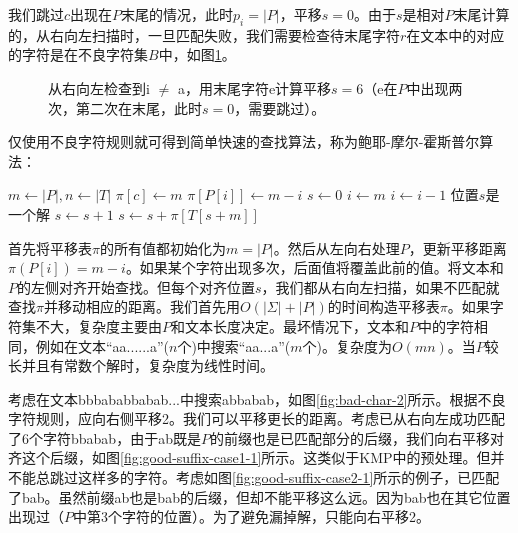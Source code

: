 \documentclass[b5paper]{ctexart}
\begin{document}
我们跳过$c$出现在$P$末尾的情况，此时$p_i = |P|$，平移$s = 0$。由于$s$是相对$P$末尾计算的，从右向左扫描时，一旦匹配失败，我们需要检查待末尾字符$r$在文本中的对应的字符是在不良字符集$B$中，如图\ref{fig:good-char-2}。

\begin{figure}[htbp]
 \centering
 \caption{从右向左检查到i $\neq$ a，用末尾字符e计算平移$s = 6$（e在$P$中出现两次，第二次在末尾，此时$s=0$，需要跳过）。}
 \label{fig:good-char-2}
\end{figure}

仅使用不良字符规则就可得到简单快速的查找算法，称为鲍耶-摩尔-霍斯普尔算法\cite{boyer-moore-horspool}：

\begin{algorithmic}[1]
  \State $m \gets |P|, n \gets |T|$
    \State $\pi[c] \gets m$ 
  \EndFor
   
    \State $\pi[P[i]] \gets m - i$ 
  \EndFor
  \State $s \gets 0$
    \State $i \gets m$
     
      \State $i \gets i - 1$
    \EndWhile
      \State 位置$s$是一个解
      \State $s \gets s + 1$ 
    \Else
      \State $s \gets s + \pi[T[s + m]]$
    \EndIf
  \EndWhile
\EndProcedure
\end{algorithmic}

首先将平移表$\pi$的所有值都初始化为$m = |P|$。然后从左向右处理$P$，更新平移距离$\pi(P[i]) = m - i$。如果某个字符出现多次，后面值将覆盖此前的值。将文本和$P$的左侧对齐开始查找。但每个对齐位置$s$，我们都从右向左扫描，如果不匹配就查找$\pi$并移动相应的距离。我们首先用$O(|\Sigma| + |P|)$的时间构造平移表$\pi$。如果字符集不大，复杂度主要由$P$和文本长度决定。最坏情况下，文本和$P$中的字符相同，例如在文本“aa......a”($n$个)中搜索“aa...a”($m$个)。复杂度为$O(mn)$。当$P$较长并且有常数个解时，复杂度为线性时间。

考虑在文本bbbababbabab...中搜索abbabab，如图\ref{fig:bad-char-2}所示。根据不良字符规则，应向右侧平移2。我们可以平移更长的距离。考虑已从右向左成功匹配了6个字符bbabab，由于ab既是$P$的前缀也是已匹配部分的后缀，我们向右平移对齐这个后缀，如图\ref{fig:good-suffix-case1-1}所示。这类似于KMP中的预处理。但并不能总跳过这样多的字符。考虑如图\ref{fig:good-suffix-case2-1}所示的例子，已匹配了bab。虽然前缀ab也是bab的后缀，但却不能平移这么远。因为bab也在其它位置出现过（$P$中第3个字符的位置）。为了避免漏掉解，只能向右平移2。
\end{document}
